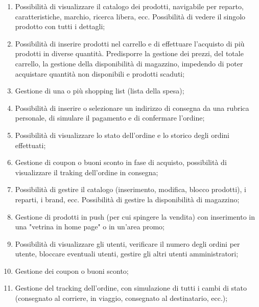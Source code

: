 \begin{enumerate}
		
	\item
		\label{f-up}
		Possibilità di visualizzare il catalogo dei prodotti, navigabile per reparto, caratteristiche, marchio, ricerca libera, ecc.
		Possibilità di vedere il singolo prodotto con tutti i dettagli;
		
	\item
		Possibilità di inserire prodotti nel carrello e di effettuare l'acquisto di più prodotti in diverse quantità.
		Predisporre la gestione dei prezzi, del totale carrello, la gestione della disponibilità di magazzino, impedendo di poter acquistare quantità non disponibili e prodotti scaduti;
		
	\item
		Gestione di una o più shopping list (lista della spesa);
		
	\item
		Possibilità di inserire o selezionare un indirizzo di consegna da una rubrica personale, di simulare il pagamento e di confermare l'ordine;
		
	\item
		Possibilità di visualizzare lo stato dell'ordine e lo storico degli ordini effettuati;
		
	\item
		\label{ef-ur}
		Gestione di coupon o buoni sconto in fase di acquisto, possibilità di visualizzare il traking dell'ordine in consegna;
		
	\item
		\label{sf-ua}
		Possibilità di gestire il catalogo (inserimento, modifica, blocco prodotti), i reparti, i brand, ecc.
		Possibilità di gestire la disponibilità di magazzino;
	
	\item
		Gestione di prodotti in push (per cui spingere la vendita) con inserimento in una "vetrina in home page" o in un'area promo;
	
	\item
		Possibilità di visualizzare gli utenti, verificare il numero degli ordini per utente, bloccare eventuali utenti, gestire gli altri utenti amministratori;
	
	\item
		Gestione dei coupon o buoni sconto;
	
	\item
		\label{ef-ua}
		Gestione del tracking dell'ordine, con simulazione di tutti i cambi di stato (consegnato al corriere, in viaggio, consegnato al destinatario, ecc.);
		
\end{enumerate}

